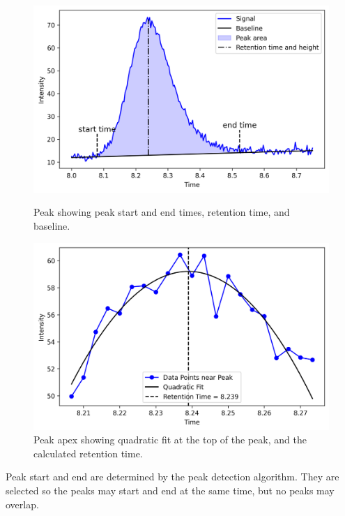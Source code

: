 \documentclass{article}
\begin{document}
\begin{figure}[t]
    \centering
    \begin{minipage}[t]{0.45\textwidth}
        \centering
        \includegraphics[width=\textwidth]{baseline_and_retention_time} %
        \caption{Peak showing peak start and end times, retention time, and baseline.}\label{fig:times}
        \vfill
    \end{minipage}\hfill 
    \begin{minipage}[t]{0.45\textwidth}
        \centering
        \includegraphics[width=\textwidth]{quadratic_fit} %
        \caption{Peak apex showing quadratic fit at the top of the peak, and the calculated retention time.}\label{fig:quad-fit}
    \end{minipage}
\end{figure}

Peak start and end are determined by the peak detection algorithm. They are selected so the peaks may start and end at the same time, but no peaks may overlap. 
\end{document}
